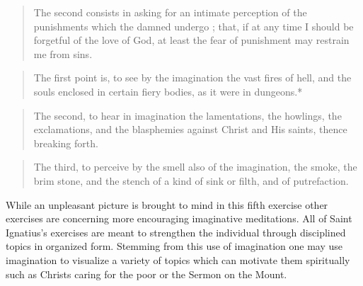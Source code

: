 \documentclass[11pt,a4paper]{scrartcl} %
\begin{document}
\begin{verse}
The second consists in asking for an intimate perception of the punishments which the damned undergo ; that, if at any time I should be forgetful of the love of God, at least the fear of punishment may restrain me from sins.
\end{verse}
\begin{verse}
The first point is, to see by the imagination the vast fires of hell, and the souls enclosed in certain fiery bodies, as it were in dungeons.*
\end{verse}
\begin{verse}
The second, to hear in imagination the lamentations, the howlings, the exclamations, and the blasphemies against Christ and His saints, thence breaking forth.
\end{verse}
\begin{verse}
The third, to perceive by the smell also of the imagination, the smoke, the brim stone, and the stench of a kind of sink or filth, and of putrefaction. 
\end{verse}
\begin{doublespace}
While an unpleasant picture is brought to mind in this fifth exercise other exercises are concerning more encouraging imaginative meditations. All of Saint Ignatius's exercises are meant to strengthen the individual through disciplined topics in organized form. Stemming from this use of imagination one may use imagination to visualize a variety of topics which can motivate them spiritually such as Christs caring for the poor or the Sermon on the Mount.
\end{doublespace}
\end{document}

